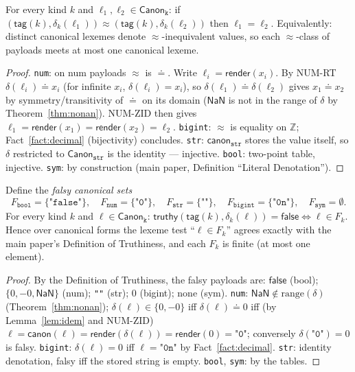 \documentclass[11pt]{article}
\newcommand{\tagfn}{\mathsf{tag}}
\newcommand{\Canon}[1]{\mathsf{Canon}_{\texttt{#1}}}
\newcommand{\canon}{\mathsf{canon}}
\newcommand{\render}{\mathsf{render}}
\newcommand{\zeq}{\doteq}   %
\newcommand{\truthy}{\mathsf{truthy}}
\begin{document}
\begin{theorem}
\label{thm:inj}
For every kind $k$ and $\ell_1, \ell_2 \in \Canon{k}$: if
$(\tagfn(k), \delta_k(\ell_1)) \approx (\tagfn(k), \delta_k(\ell_2))$
then $\ell_1 = \ell_2$. Equivalently: distinct canonical lexemes denote
$\approx$-inequivalent values, so each $\approx$-class of payloads meets
at most one canonical lexeme.
\end{theorem}
\begin{proof}
\texttt{num}: on num payloads $\approx$ is $\zeq$. Write
$\ell_i = \render(x_i)$. By NUM-RT $\delta(\ell_i) \zeq x_i$
(for infinite $x_i$, $\delta(\ell_i) = x_i$), so
$\delta(\ell_1) \zeq \delta(\ell_2)$ gives $x_1 \zeq x_2$ by
symmetry/transitivity of $\zeq$ on its domain ($\mathsf{NaN}$ is not in
the range of $\delta$ by Theorem~\ref{thm:nonan}). NUM-ZID then gives
$\ell_1 = \render(x_1) = \render(x_2) = \ell_2$.
\texttt{bigint}: $\approx$ is equality on $\mathbb{Z}$;
Fact~\ref{fact:decimal} (bijectivity) concludes.
\texttt{str}: $\canon_{\texttt{str}}$ stores the value itself, so
$\delta$ restricted to $\Canon{str}$ is the identity --- injective.
\texttt{bool}: two-point table, injective. \texttt{sym}: by construction
(main paper, Definition ``Literal Denotation'').
\end{proof}

\begin{theorem}
\label{thm:falsy}
Define the \emph{falsy canonical sets}
\[
F_{\texttt{bool}} = \{\texttt{"false"}\},\quad
F_{\texttt{num}} = \{\texttt{"0"}\},\quad
F_{\texttt{str}} = \{\texttt{""}\},\quad
F_{\texttt{bigint}} = \{\texttt{"0n"}\},\quad
F_{\texttt{sym}} = \emptyset .
\]
For every kind $k$ and $\ell \in \Canon{k}$:
$\truthy(\tagfn(k), \delta_k(\ell)) = \mathsf{false}
\iff \ell \in F_k$. Hence over canonical forms the lexeme test
``$\ell \in F_k$'' agrees exactly with the main paper's Definition of
Truthiness, and each $F_k$ is finite (at most one element).
\end{theorem}
\begin{proof}
By the Definition of Truthiness, the falsy payloads are:
$\mathsf{false}$ (bool); $\{0, -0, \mathsf{NaN}\}$ (num); \texttt{""}
(str); $0$ (bigint); none (sym).
\texttt{num}: $\mathsf{NaN} \notin \mathrm{range}(\delta)$
(Theorem~\ref{thm:nonan}); $\delta(\ell) \in \{0,-0\}$ iff
$\delta(\ell) \zeq 0$ iff (by Lemma~\ref{lem:idem} and NUM-ZID)
$\ell = \canon(\ell) = \render(\delta(\ell)) = \render(0) =
\texttt{"0"}$; conversely $\delta(\texttt{"0"}) = 0$ is falsy.
\texttt{bigint}: $\delta(\ell) = 0$ iff $\ell = \texttt{"0n"}$ by
Fact~\ref{fact:decimal}. \texttt{str}: identity denotation, falsy iff the
stored string is empty. \texttt{bool}, \texttt{sym}: by the tables.
\end{proof}
\end{document}
